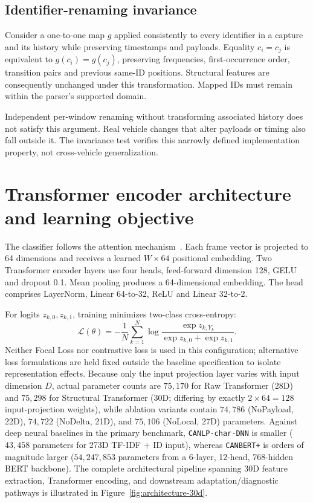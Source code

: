 \documentclass[12pt, a4paper, reqno, oneside]{book}
\DeclareRobustCommand{\code}[1]{\nolinkurl{#1}}
\begin{document}
\subsection{Identifier-renaming invariance}
Consider a one-to-one map $g$ applied consistently to every identifier in a capture and its history while preserving timestamps and payloads. Equality $c_i=c_j$ is equivalent to $g(c_i)=g(c_j)$, preserving frequencies, first-occurrence order, transition pairs and previous same-ID positions. Structural features are consequently unchanged under this transformation. Mapped IDs must remain within the parser's supported domain.

Independent per-window renaming without transforming associated history does not satisfy this argument. Real vehicle changes that alter payloads or timing also fall outside it. The invariance test verifies this narrowly defined implementation property, not cross-vehicle generalization.

\section{Transformer encoder architecture and learning objective}\label{sec:transformer-encoder}
The classifier follows the attention mechanism~\cite{vaswani2017attention}. Each frame vector is projected to 64 dimensions and receives a learned $W\times64$ positional embedding. Two Transformer encoder layers use four heads, feed-forward dimension 128, GELU and dropout 0.1. Mean pooling produces a 64-dimensional embedding. The head comprises LayerNorm, Linear 64-to-32, ReLU and Linear 32-to-2.

For logits $z_{k,0},z_{k,1}$, training minimizes two-class cross-entropy:
\begin{equation}
\mathcal L(\theta)=-\frac1N\sum_{k=1}^N\log\frac{\exp z_{k,Y_k}}{\exp z_{k,0}+\exp z_{k,1}}.
\end{equation}
Neither Focal Loss nor contrastive loss is used in this configuration; alternative loss formulations are held fixed outside the baseline specification to isolate representation effects. Because only the input projection layer varies with input dimension $D$, actual parameter counts are $75{,}170$ for Raw Transformer (28D) and $75{,}298$ for Structural Transformer (30D; differing by exactly $2 \times 64 = 128$ input-projection weights), while ablation variants contain $74{,}786$ (NoPayload, 22D), $74{,}722$ (NoDelta, 21D), and $75{,}106$ (NoLocal, 27D) parameters. Against deep neural baselines in the primary benchmark, \code{CANLP-char-DNN} is smaller ($43{,}458$ parameters for 273D TF-IDF + ID input), whereas \code{CANBERT+} is orders of magnitude larger ($54{,}247{,}853$ parameters from a 6-layer, 12-head, 768-hidden BERT backbone). The complete architectural pipeline spanning 30D feature extraction, Transformer encoding, and downstream adaptation/diagnostic pathways is illustrated in Figure~\ref{fig:architecture-30d}.
\end{document}
